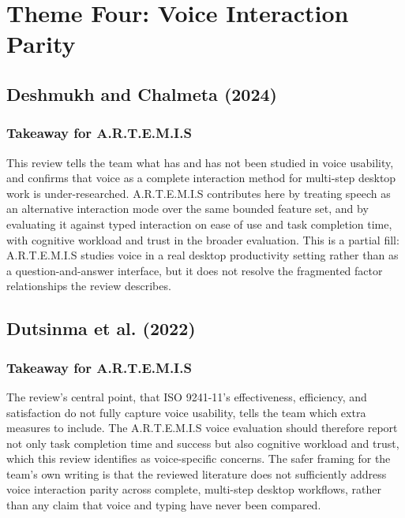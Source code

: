 \documentclass[11pt,a4paper]{report}
\newcommand{\artemis}{A.R.T.E.M.I.S}
\begin{document}
\section{Theme Four: Voice Interaction Parity}

\subsection{Deshmukh and Chalmeta (2024)}

\subsubsection{Takeaway for \artemis{}}

This review tells the team what has and has not been studied in voice
usability, and confirms that voice as a complete interaction method for
multi-step desktop work is under-researched. \artemis{} contributes here
by treating speech as an alternative interaction mode over the same
bounded feature set, and by evaluating it against typed interaction on
ease of use and task completion time, with cognitive workload and trust
in the broader evaluation. This is a partial fill: \artemis{} studies
voice in a real desktop productivity setting rather than as a
question-and-answer interface, but it does not resolve the fragmented
factor relationships the review describes.

\subsection{Dutsinma et al. (2022)}

\subsubsection{Takeaway for \artemis{}}

The review's central point, that ISO 9241-11's effectiveness,
efficiency, and satisfaction do not fully capture voice usability, tells
the team which extra measures to include. The \artemis{} voice
evaluation should therefore report not only task completion time and
success but also cognitive workload and trust, which this review
identifies as voice-specific concerns. The safer framing for the team's
own writing is that the reviewed literature does not sufficiently
address voice interaction parity across complete, multi-step desktop
workflows, rather than any claim that voice and typing have never been
compared.
\end{document}
